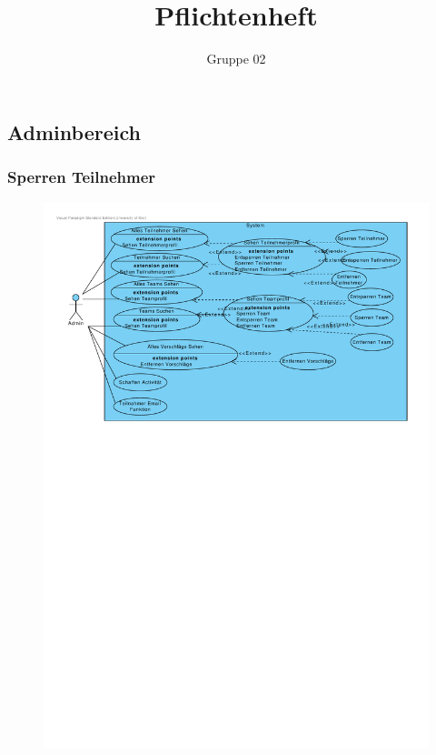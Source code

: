 \documentclass[10pt,a4paper]{article}
\author{Gruppe 02}
\title{Pflichtenheft}
\begin{document}
	\subsection{Adminbereich}
	\subsubsection{Sperren Teilnehmer}
	\begin{figure}[h]
		\includegraphics[width=\linewidth]{gfx/webseite/adminbereich.pdf}
	\end{figure}
\end{document}
